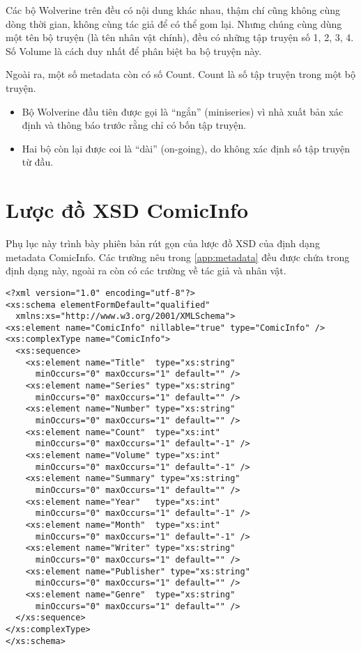 \documentclass[../../../thesis]{subfiles}
\begin{document}
\begin{appendices}
Các bộ Wolverine trên đều có nội dung khác nhau, thậm chí cũng không cùng dòng
thời gian, không cùng tác giả để có thể gom lại. Nhưng chúng cùng dùng một tên
bộ truyện (là tên nhân vật chính), đều có những tập truyện số 1, 2, 3, 4. Số
Volume là cách duy nhất để phân biệt ba bộ truyện này.

Ngoài ra, một số metadata còn có số Count. Count là số tập truyện trong một bộ
truyện.

\begin{itemize}
    \item
        Bộ Wolverine đầu tiên được gọi là ``ngắn'' (miniseries) vì nhà xuất bản
        xác định và thông báo trước rằng chỉ có bốn tập truyện.
    \item
        Hai bộ còn lại được coi là ``dài'' (on-going), do không xác định số tập
        truyện từ đầu.
\end{itemize}



\chapter{Lược đồ XSD ComicInfo}\label{app:comic-info-xsd}

Phụ lục này trình bày phiên bản rút gọn của lược đồ XSD của định dạng metadata
ComicInfo. Các trường nêu trong \autoref{app:metadata} đều được chứa trong định
dạng này, ngoài ra còn có các trường về tác giả và nhân vật.


\begin{verbatim}
<?xml version="1.0" encoding="utf-8"?>
<xs:schema elementFormDefault="qualified"
  xmlns:xs="http://www.w3.org/2001/XMLSchema">
<xs:element name="ComicInfo" nillable="true" type="ComicInfo" />
<xs:complexType name="ComicInfo">
  <xs:sequence>
    <xs:element name="Title"  type="xs:string"
      minOccurs="0" maxOccurs="1" default="" />
    <xs:element name="Series" type="xs:string"
      minOccurs="0" maxOccurs="1" default="" />
    <xs:element name="Number" type="xs:string"
      minOccurs="0" maxOccurs="1" default="" />
    <xs:element name="Count"  type="xs:int"
      minOccurs="0" maxOccurs="1" default="-1" />
    <xs:element name="Volume" type="xs:int"
      minOccurs="0" maxOccurs="1" default="-1" />
    <xs:element name="Summary" type="xs:string"
      minOccurs="0" maxOccurs="1" default="" />
    <xs:element name="Year"   type="xs:int"
      minOccurs="0" maxOccurs="1" default="-1" />
    <xs:element name="Month"  type="xs:int"
      minOccurs="0" maxOccurs="1" default="-1" />
    <xs:element name="Writer" type="xs:string"
      minOccurs="0" maxOccurs="1" default="" />
    <xs:element name="Publisher" type="xs:string"
      minOccurs="0" maxOccurs="1" default="" />
    <xs:element name="Genre"  type="xs:string"
      minOccurs="0" maxOccurs="1" default="" />
  </xs:sequence>
</xs:complexType>
</xs:schema>
\end{verbatim}

\end{appendices}
\end{document}
